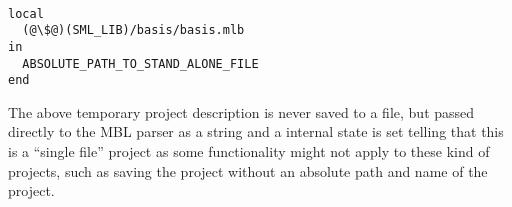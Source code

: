 
\begin{example}\
\begin{lstlisting}
local
  (@\$@)(SML_LIB)/basis/basis.mlb
in
  ABSOLUTE_PATH_TO_STAND_ALONE_FILE
end
\end{lstlisting}
\end{example}

The above temporary project description is never saved to a file, but passed
directly to the MBL parser as a string and a internal state is set telling that
this is a ``single file'' project as some functionality might not apply to these
kind of projects, such as saving the project without an absolute path and name
of the project.


